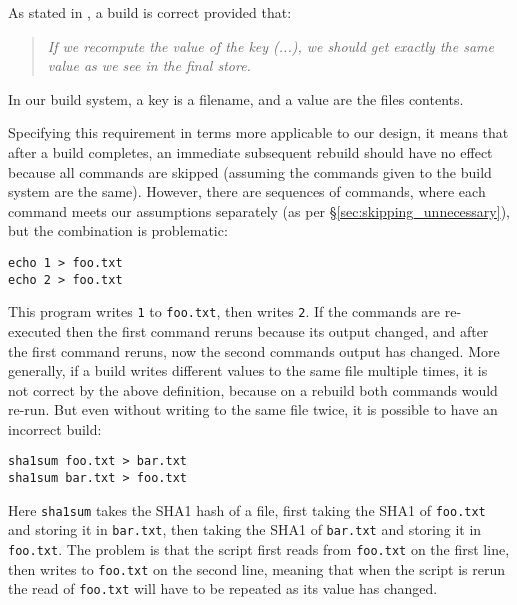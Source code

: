 As stated in \citet[\S3.6]{build_systems_a_la_carte}, a build is correct provided that:

\begin{quote}
\emph{If we recompute the value of the key (...), we should get exactly the same value as we see in the final store.}
\end{quote}

In our build system, a key is a filename, and a value are the files contents.

Specifying this requirement in terms more applicable to our design, it means that after a build completes, an immediate subsequent rebuild should have no effect because all commands are skipped (assuming the commands given to the build system are the same). However, there are sequences of commands, where each command meets our assumptions separately (as per \S\ref{sec:skipping_unnecessary}), but the combination is problematic:

\vspace{1mm}
\begin{small}
\begin{verbatim}
echo 1 > foo.txt
echo 2 > foo.txt
\end{verbatim}
\end{small}
\vspace{1mm}

\noindent
This program writes \texttt{1} to \texttt{foo.txt}, then writes \texttt{2}. If the commands are re-executed then the first command reruns because its output changed, and after the first command reruns, now the second commands output has changed. More generally, if a build writes different values to the same file multiple times, it is not correct by the above definition, because on a rebuild both commands would re-run. But even without writing to the same file twice, it is possible to have an incorrect build:

\vspace{1mm}
\begin{small}
\begin{verbatim}
sha1sum foo.txt > bar.txt
sha1sum bar.txt > foo.txt
\end{verbatim}
\end{small}
\vspace{1mm}

\noindent
Here \texttt{sha1sum} takes the SHA1 hash of a file, first taking the SHA1 of \texttt{foo.txt} and storing it in \texttt{bar.txt}, then taking the SHA1 of \texttt{bar.txt} and storing it in \texttt{foo.txt}. The problem is that the script first reads from \texttt{foo.txt} on the first line, then writes to \texttt{foo.txt} on the second line, meaning that when the script is rerun the read of \texttt{foo.txt} will have to be repeated as its value has changed.

